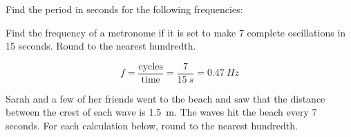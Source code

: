 \documentclass[]{exam}
\begin{document}
\begin{questions}
\question
Find the period in seconds for the following frequencies:


\question
Find the frequency of a metronome if it is set to make 7 complete oscillations in 15 seconds. Round to the nearest hundredth.

\begin{solution}
\begin{equation*}
    f = \frac{\text{cycles}}{\text{time}} = \frac{7}{\SI{15}{s}} = \boxed{\SI{0.47}{Hz}}
\end{equation*}
\end{solution}

\question
Sarah and a few of her friends went to the beach and saw that the distance between the crest of each wave is \SI{1.5}{m}. The waves hit the beach every 7 seconds. For each calculation below, round to the nearest hundredth.

\end{questions}
\end{document}
